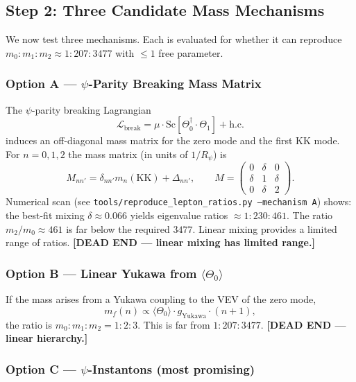 \documentclass[12pt,a4paper]{article}
\theoremstyle{remark}
\begin{document}
\subsection{Step 2: Three Candidate Mass Mechanisms}
\label{subsec:mass_mechanisms}

We now test three mechanisms.  Each is evaluated for whether it can
reproduce $m_0 : m_1 : m_2 \approx 1 : 207 : 3477$ with $\leq 1$ free parameter.

\subsubsection{Option A --- $\psi$-Parity Breaking Mass Matrix}

The $\psi$-parity breaking Lagrangian
\[
  \mathcal{L}_\mathrm{break} = \mu \cdot \mathrm{Sc}[\Theta_0^\dagger \cdot \Theta_1] + \mathrm{h.c.}
\]
induces an off-diagonal mass matrix for the zero mode and the first KK mode.
For $n = 0, 1, 2$ the mass matrix (in units of $1/R_\psi$) is
\[
  M_{nn'} = \delta_{nn'} m_n(\mathrm{KK}) + \Delta_{nn'},
  \qquad
  M = \begin{pmatrix} 0 & \delta & 0 \\ \delta & 1 & \delta \\ 0 & \delta & 2 \end{pmatrix}.
\]
Numerical scan (see \texttt{tools/reproduce\_lepton\_ratios.py --mechanism A}) shows:
the best-fit mixing $\delta \approx 0.066$ yields eigenvalue ratios
$\approx 1 : 230 : 461$.  The ratio $m_2/m_0 \approx 461$ is far below the
required $3477$.  Linear mixing provides a limited range of ratios.
\textbf{[DEAD END --- linear mixing has limited range.]}

\subsubsection{Option B --- Linear Yukawa from $\langle\Theta_0\rangle$}

If the mass arises from a Yukawa coupling to the VEV of the zero mode,
\[
  m_f(n) \propto \langle\Theta_0\rangle \cdot g_\mathrm{Yukawa} \cdot (n+1),
\]
the ratio is $m_0 : m_1 : m_2 = 1 : 2 : 3$.  This is far from $1 : 207 : 3477$.
\textbf{[DEAD END --- linear hierarchy.]}

\subsubsection{Option C --- $\psi$-Instantons (most promising)}
\end{document}
